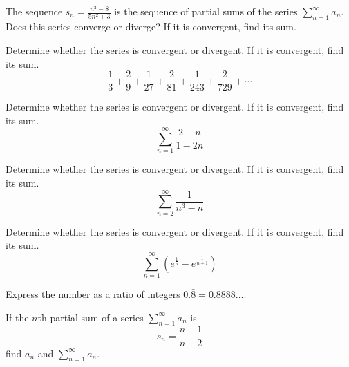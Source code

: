 \documentclass[
  course = {{MATH102 Calculus II}},
  quartile = {{2}},
  assignment = {{Sections 11.2}},%
  topic = {{Series}},
  firstexercise = 1,
  term = 203
]{../class/aga-homework}
\begin{document}
\newpage

\problem The sequence $\displaystyle s_n=\frac{n^2-8}{5n^2+3}$ is the sequence of partial sums of the series $\displaystyle \sum_{n=1}^{\infty}a_n$. Does this series converge or diverge? If it is convergent, find its sum.
\newpage

\problem Determine whether the series is convergent or divergent. If it is convergent, find its sum.
\[
\frac{1}{3}+\frac{2}{9}+\frac{1}{27}+\frac{2}{81}+\frac{1}{243}+\frac{2}{729}+\cdots
\]
\newpage


\problem Determine whether the series is convergent or divergent. If it is convergent, find its sum.
\[
\sum_{n=1}^{\infty} \frac{2+n}{1-2n}
\]
\newpage



\problem Determine whether the series is convergent or divergent. If it is convergent, find its sum.
\[
\sum_{n=2}^{\infty} \frac{1}{n^3-n}
\]
\newpage


\problem Determine whether the series is convergent or divergent. If it is convergent, find its sum.
\[
\sum_{n=1}^{\infty} \left(e^{\frac{1}{n}}-e^{\frac{1}{n+1}}\right)
\]
\newpage

\problem Express the number as a ratio of integers $0.\bar{8}=0.8888...$.
\newpage

\problem If the $n$th partial sum of a series $\displaystyle \sum_{n=1}^{\infty}a_n$ is
\[
s_n=\frac{n-1}{n+2}
\]
find $a_n$ and $\displaystyle \sum_{n=1}^{\infty}a_n$.
\newpage

\afterpage{\null\newpage}

\afterpage{\null\newpage}

\afterpage{\null\newpage}
\end{document}

